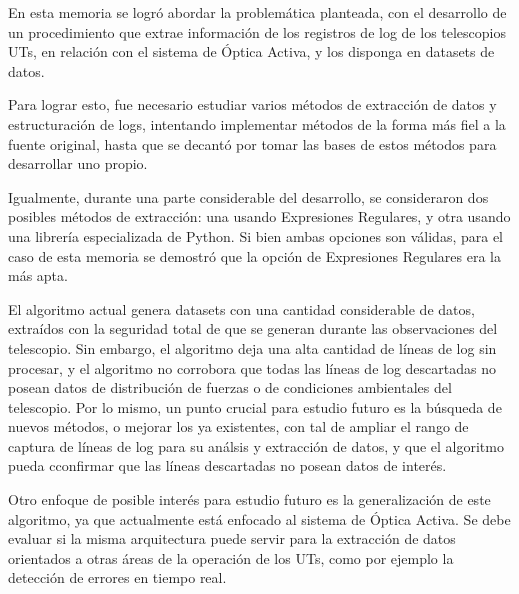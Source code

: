 
En esta memoria se logró abordar la problemática planteada, con el desarrollo de un procedimiento que extrae información de los registros de log de los telescopios UTs, en relación con el sistema de Óptica Activa, y los disponga en datasets de datos.

Para lograr esto, fue necesario estudiar varios métodos de extracción de datos y estructuración de logs, intentando implementar métodos de la forma más fiel a la fuente original, hasta que se decantó por tomar las bases de estos métodos para desarrollar uno propio.

Igualmente, durante una parte considerable del desarrollo, se consideraron dos posibles métodos de extracción: una usando Expresiones Regulares, y otra usando una librería especializada de Python. Si bien ambas opciones son válidas, para el caso de esta memoria se demostró que la opción de Expresiones Regulares era la más apta.

El algoritmo actual genera datasets con una cantidad considerable de datos, extraídos con la seguridad total de que se generan durante las observaciones del telescopio. Sin embargo, el algoritmo deja una alta cantidad de líneas de log sin procesar, y el algoritmo no corrobora que todas las líneas de log descartadas no posean datos de distribución de fuerzas o de condiciones ambientales del telescopio. Por lo mismo, un punto crucial para estudio futuro es la búsqueda de nuevos métodos, o mejorar los ya existentes, con tal de ampliar el rango de captura de líneas de log para su análsis y extracción de datos, y que el algoritmo pueda cconfirmar que las líneas descartadas no posean datos de interés.

Otro enfoque de posible interés para estudio futuro es la generalización de este algoritmo, ya que actualmente está enfocado al sistema de Óptica Activa. Se debe evaluar si la misma arquitectura puede servir para la extracción de datos orientados a otras áreas de la operación de los UTs, como por ejemplo la detección de errores en tiempo real.